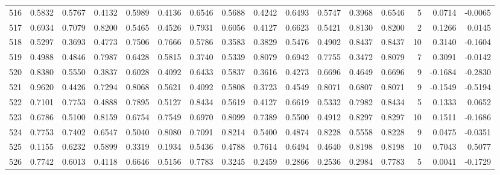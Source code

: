 \begin{tabular}{lrrrrrrrrrrrrrrr}
516 &      0.5832 &  0.5767 &  0.4132 &  0.5989 &  0.4136 &  0.6546 &  0.5688 &  0.4242 &  0.6493 &  0.5747 &   0.3968 &     0.6546 &      5 &                    0.0714 &                    -0.0065 \\
517 &      0.6934 &  0.7079 &  0.8200 &  0.5465 &  0.4526 &  0.7931 &  0.6056 &  0.4127 &  0.6623 &  0.5421 &   0.8130 &     0.8200 &      2 &                    0.1266 &                     0.0145 \\
518 &      0.5297 &  0.3693 &  0.4773 &  0.7506 &  0.7666 &  0.5786 &  0.3583 &  0.3829 &  0.5476 &  0.4902 &   0.8437 &     0.8437 &     10 &                    0.3140 &                    -0.1604 \\
519 &      0.4988 &  0.4846 &  0.7987 &  0.6428 &  0.5815 &  0.3740 &  0.5339 &  0.8079 &  0.6942 &  0.7755 &   0.3472 &     0.8079 &      7 &                    0.3091 &                    -0.0142 \\
520 &      0.8380 &  0.5550 &  0.3837 &  0.6028 &  0.4092 &  0.6433 &  0.5837 &  0.3616 &  0.4273 &  0.6696 &   0.4649 &     0.6696 &      9 &                   -0.1684 &                    -0.2830 \\
521 &      0.9620 &  0.4426 &  0.7294 &  0.8068 &  0.5621 &  0.4092 &  0.5808 &  0.3723 &  0.4549 &  0.8071 &   0.6807 &     0.8071 &      9 &                   -0.1549 &                    -0.5194 \\
522 &      0.7101 &  0.7753 &  0.4888 &  0.7895 &  0.5127 &  0.8434 &  0.5619 &  0.4127 &  0.6619 &  0.5332 &   0.7982 &     0.8434 &      5 &                    0.1333 &                     0.0652 \\
523 &      0.6786 &  0.5100 &  0.8159 &  0.6754 &  0.7549 &  0.6970 &  0.8099 &  0.7389 &  0.5500 &  0.4912 &   0.8297 &     0.8297 &     10 &                    0.1511 &                    -0.1686 \\
524 &      0.7753 &  0.7402 &  0.6547 &  0.5040 &  0.8080 &  0.7091 &  0.8214 &  0.5400 &  0.4874 &  0.8228 &   0.5558 &     0.8228 &      9 &                    0.0475 &                    -0.0351 \\
525 &      0.1155 &  0.6232 &  0.5899 &  0.3319 &  0.1934 &  0.5436 &  0.4788 &  0.7614 &  0.6494 &  0.4640 &   0.8198 &     0.8198 &     10 &                    0.7043 &                     0.5077 \\
526 &      0.7742 &  0.6013 &  0.4118 &  0.6646 &  0.5156 &  0.7783 &  0.3245 &  0.2459 &  0.2866 &  0.2536 &   0.2984 &     0.7783 &      5 &                    0.0041 &                    -0.1729 \\

\end{tabular}
